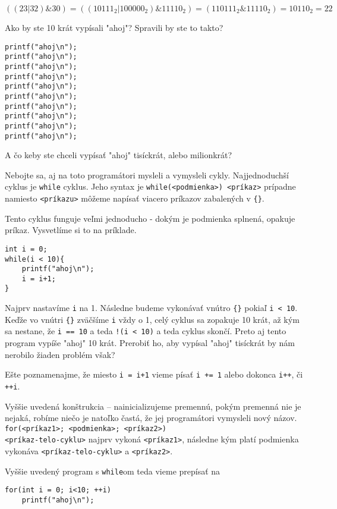 \riesenie $((23 | 32) \& 30) = ((10111_2 | 100000_2) \& 11110_2) = (110111_2 \&
11110_2) = 10110_2 = 22$


Ako by ste 10 krát vypísali "ahoj"? Spravili by ste to takto?
\begin{lstlisting}
printf("ahoj\n");
printf("ahoj\n");
printf("ahoj\n");
printf("ahoj\n");
printf("ahoj\n");
printf("ahoj\n");
printf("ahoj\n");
printf("ahoj\n");
printf("ahoj\n");
printf("ahoj\n");
\end{lstlisting}
A čo keby ste chceli vypísať "ahoj" tisíckrát, alebo milionkrát?

Nebojte sa, aj na toto programátori mysleli a vymysleli cykly.  Najjednoduchší
cyklus je \verb!while! cyklus. Jeho syntax je 
\verb!while(<podmienka>) <príkaz>! prípadne namiesto \verb!<príkazu>! 
môžeme napísať viacero príkazov zabalených v \verb!{}!.

Tento cyklus funguje veľmi jednoducho - dokým je podmienka splnená, opakuje
príkaz. Vysvetlíme si to na príklade.
\begin{lstlisting}
int i = 0;
while(i < 10){
    printf("ahoj\n");
    i = i+1;
}
\end{lstlisting}
Najprv nastavíme \verb!i! na 1. Následne budeme vykonávať vnútro \verb!{}! pokiaľ 
\verb!i < 10!. Keďže vo vnútri \verb!{}! zväčšíme \verb!i! vždy o 1, celý cyklus sa zopakuje
10 krát, až kým sa nestane, že \verb!i == 10! a teda \verb'!(i < 10)' a teda cyklus
skončí.  Preto aj tento program vypíše "ahoj" 10 krát. Prerobiť ho, aby vypísal
"ahoj" tisíckrát by nám nerobilo žiaden problém však?

Ešte poznamenajme, že miesto \verb!i = i+1! vieme písať \verb!i += 1! alebo
dokonca \verb!i++!, či \verb!++i!.

\medskip

Vyššie uvedená konštrukcia -- nainicializujeme premennú, pokým premenná nie je
nejaká, robíme niečo je natoľko častá, že jej programátori vymysleli nový
názov. \verb!for(<príkaz1>; <podmienka>; <príkaz2>)!\\ \verb!<príkaz-telo-cyklu>!
najprv vykoná \verb!<príkaz1>!, následne kým platí podmienka vykonáva
\verb!<príkaz-telo-cyklu>! a \verb!<príkaz2>!.

Vyššie uvedený program s \verb!while!om teda vieme prepísať na
\begin{lstlisting}
for(int i = 0; i<10; ++i)
    printf("ahoj\n");
\end{lstlisting}

